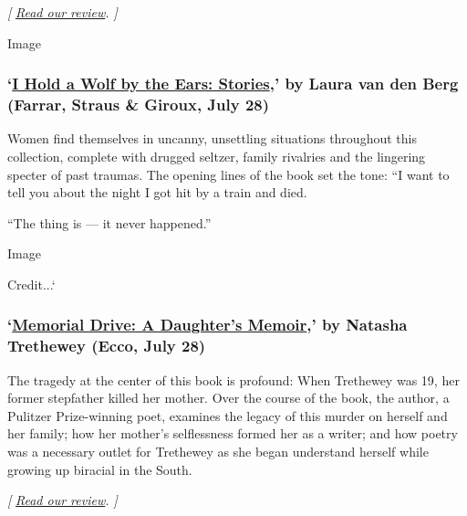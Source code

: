 \emph{{[}}
\href{https://www.nytimes3xbfgragh.onion/2020/07/17/books/review/hamnet-maggie-ofarrell.html}{\emph{Read
our review}}\emph{. {]}}

Image

\hypertarget{i-hold-a-wolf-by-the-ears-stories-by-laura-van-den-berg-farrar-straus--giroux-july-28}{%
\subsubsection{\texorpdfstring{`\href{https://us.macmillan.com/books/9780374102098}{I
Hold a Wolf by the Ears: Stories},' by Laura van den Berg (Farrar,
Straus \& Giroux, July
28)}{`I Hold a Wolf by the Ears: Stories,' by Laura van den Berg (Farrar, Straus \& Giroux, July 28)}}\label{i-hold-a-wolf-by-the-ears-stories-by-laura-van-den-berg-farrar-straus--giroux-july-28}}

Women find themselves in uncanny, unsettling situations throughout this
collection, complete with drugged seltzer, family rivalries and the
lingering specter of past traumas. The opening lines of the book set the
tone: ``I want to tell you about the night I got hit by a train and
died.

``The thing is --- it never happened.''

Image

Credit...`

\hypertarget{memorial-drive-a-daughters-memoir-by-natasha-trethewey-ecco-july-28}{%
\subsubsection{\texorpdfstring{`\href{https://www.harpercollins.com/9780062248572/memorial-drive/}{Memorial
Drive: A Daughter's Memoir},' by Natasha Trethewey (Ecco, July
28)}{`Memorial Drive: A Daughter's Memoir,' by Natasha Trethewey (Ecco, July 28)}}\label{memorial-drive-a-daughters-memoir-by-natasha-trethewey-ecco-july-28}}

The tragedy at the center of this book is profound: When Trethewey was
19, her former stepfather killed her mother. Over the course of the
book, the author, a Pulitzer Prize-winning poet, examines the legacy of
this murder on herself and her family; how her mother's selflessness
formed her as a writer; and how poetry was a necessary outlet for
Trethewey as she began understand herself while growing up biracial in
the South.

\emph{{[}}
\href{https://www.nytimes3xbfgragh.onion/2020/07/27/books/review-memorial-drive-memoir-natasha-trethewey.html}{\emph{Read
our review}}\emph{. {]}}

